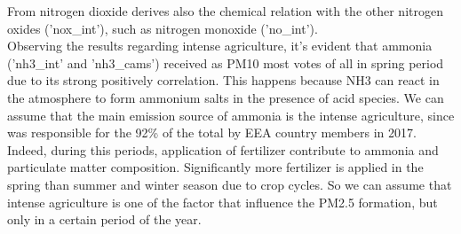 From nitrogen dioxide derives also the chemical relation with the other nitrogen oxides ('nox\_int'), such as nitrogen monoxide ('no\_int').
\\
Observing the results regarding intense agriculture, it's evident that ammonia ('nh3\_int' and 'nh3\_cams') received as PM10 most votes of all in spring period due to its strong positively correlation. 
This happens because NH3 can react in the atmosphere to form ammonium salts in the presence of acid species\cite{viatte2021ammonia}.
We can assume that the main emission source of ammonia is the intense agriculture, since was responsible for the 92\% of the total by EEA country members in 2017\cite{maranzano2022air}.\\
Indeed, during this periods, application of fertilizer contribute to ammonia and particulate matter composition.
Significantly more fertilizer is applied in the spring than summer and winter season due to crop cycles\cite{goebes2003ammonia}.
So we can assume that intense agriculture is one of the factor that influence the PM2.5 formation, but only in a certain period of the year.\\
\pagebreak
\clearpage
